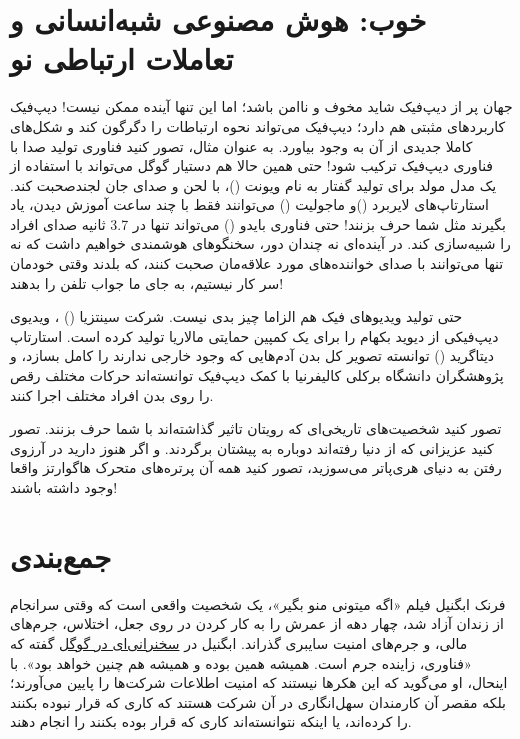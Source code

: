 \documentclass[12pt,a4paper]{report}
\begin{document}
\chapter{خوب: هوش مصنوعی شبه‌انسانی و تعاملات ارتباطی نو}\label{فصل چارم}
 	 جهان پر از دیپ‌فیک شاید مخوف و ناامن باشد؛ اما این تنها آینده ممکن نیست! دیپ‌فیک کاربردهای مثبتی هم دارد؛ دیپ‌فیک می‌تواند نحوه ارتباطات را دگرگون کند و شکل‌های کاملا جدیدی از آن به وجود بیاورد. به عنوان مثال، تصور کنید فناوری تولید صدا با فناوری دیپ‌فیک ترکیب شود! حتی همین حالا هم دستیار گوگل می‌تواند با استفاده از یک مدل مولد برای تولید گفتار به نام ویو‌نت (\lr{\textcolor{blue}{Wavenet}})، با لحن و صدای جان لجندصحبت کند. استارتاپ‌های لایربرد (\lr{\textcolor{blue}{Lyrebird}})و ماجولیت (\lr{\textcolor{blue}{Modulate}}) می‌توانند فقط با چند ساعت آموزش دیدن، یاد بگیرند مثل شما حرف بزنند! حتی فناوری بایدو (\lr{\textcolor{blue}{Baidu}}) می‌تواند تنها در 3.‌7 ثانیه صدای افراد را شبیه‌سازی کند. در آینده‌ای نه چندان دور، سخنگوهای هوشمندی خواهیم داشت که نه تنها می‌توانند با صدای خواننده‌های مورد علاقه‌مان صحبت کنند، که بلدند وقتی خودمان سر کار نیستیم، به جای ما جواب تلفن را بدهند!
 	
 حتی تولید ویدیوهای فیک هم الزاما چیز بدی نیست. شرکت سینتزیا () ، ویدیوی دیپ‌فیکی از دیوید بکهام را برای یک کمپین حمایتی مالاریا تولید کرده است. استارتاپ دیتاگرید () توانسته تصویر کل بدن آدم‌هایی که وجود خارجی ندارند را کامل بسازد، و پژوهشگران دانشگاه برکلی کالیفرنیا با کمک دیپ‌فیک توانسته‌اند حرکات مختلف رقص را روی بدن افراد مختلف اجرا کنند.


	 تصور کنید شخصیت‌های تاریخی‌ای که رویتان تاثیر گذاشته‌اند با شما حرف بزنند. تصور کنید عزیزانی که از دنیا رفته‌اند دوباره به پیشتان برگردند. و اگر هنوز دارید در آرزوی رفتن به دنیای هری‌پاتر می‌سوزید، تصور کنید همه آن پرتره‌های متحرک هاگوارتز واقعا وجود داشته باشند!
	
\chapter{جمع‌بندی}\label{فصل پنجم}
	 فرنک ابگنیل فیلم «اگه میتونی منو بگیر»، یک شخصیت واقعی است که وقتی سرانجام از زندان آزاد شد، چهار دهه از عمرش را به کار کردن در  روی جعل‌، اختلاس، جرم‌های مالی، و جرم‌های امنیت سایبری گذراند. ابگنیل در \textcolor{blue}{\href{https://www.youtube.com/watch?v=vsMydMDi3rI}{سخنرانی‌ای در گوگل}} گفته که «فناوری، زاینده جرم است. همیشه همین بوده و همیشه هم چنین خواهد بود». با اینحال، او می‌گوید که این هکرها نیستند که امنیت اطلاعات شرکت‌ها را پایین می‌آورند؛ بلکه مقصر آن کارمندان سهل‌انگاری در آن شرکت هستند که کاری که قرار نبوده بکنند را کرده‌اند، یا اینکه نتوانسته‌اند کاری که قرار بوده بکنند را انجام دهند.
	 
\end{document}
